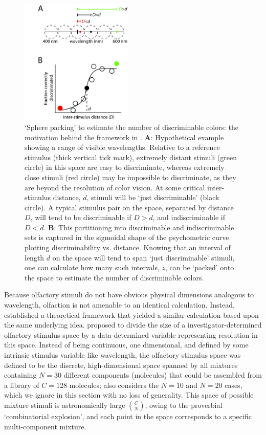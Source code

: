 \documentclass[letterpaper,twocolumn,10pt]{article}
\begin{document}
\begin{figure}[!hbt]
    \centering
    \includegraphics[width=0.475\textwidth]{figures/Fig4_SpherePacking}
    \caption{
`Sphere packing' to estimate the number of discriminable colors: the motivation behind the framework in \cite{bushdid_humans_2014}. 
\textbf{A}: Hypothetical example showing a range of visible wavelengths. 
Relative to a reference stimulus (thick vertical tick mark), extremely distant stimuli (green circle) in this space are easy to discriminate, 
whereas extremely close stimuli (red circle) may be impossible to discriminate, 
as they are beyond the resolution of color vision. 
At some critical inter-stimulus distance, $d$, 
stimuli will be `just discriminable' (black circle). 
A typical stimulus pair on the space, separated by distance $D$, 
will tend to be discriminable if $D>d$, and indiscriminable if $D<d$. 
\textbf{B}: This partitioning into discriminable and indiscriminable sets is captured in the sigmoidal shape 
of the psychometric curve plotting discriminability vs. distance. 
Knowing that an interval of length $d$ on the space will tend to span `just discriminable' stimuli, 
one can calculate how many such intervals, $z$, can be `packed' onto the space
to estimate the number of discriminable colors.}
    \label{fig:spherepacking}
\end{figure}

Because olfactory stimuli do not have obvious physical dimensions analogous to wavelength, 
olfaction is not amenable to an identical calculation.  
Instead, \cite{bushdid_humans_2014} established a theoretical framework that yielded a similar calculation based upon the same underlying idea.  
\cite{bushdid_humans_2014} proposed to divide the size of a investigator-determined olfactory stimulus space by a data-determined variable representing resolution in this space. 
Instead of being continuous, one dimensional, and defined by some intrinsic stimulus variable like wavelength, 
the olfactory stimulus space was defined to be the discrete, high-dimensional space spanned by all mixtures containing $N=30$ different components (molecules) that could be assembled from a library of $C=128$ molecules; 
\cite{bushdid_humans_2014} also considers the $N=10$ and $N=20$ cases, which we ignore in this section with no loss of generality. 
This space of possible mixture stimuli is astronomically large ${C \choose N}$, 
owing to the proverbial `combinatorial explosion', 
and each point in the space corresponds to a specific multi-component mixture. 
\end{document}
